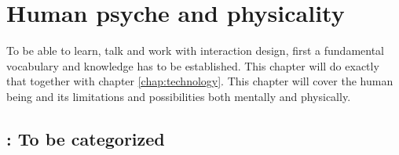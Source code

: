 \chapter{Human psyche and physicality} \label{chap:human_psyche_and_physicality}
To be able to learn, talk and work with interaction design, first a fundamental vocabulary and knowledge has to be established. This chapter will do exactly that together with chapter \ref{chap:technology}. This chapter will cover the human being and its limitations and possibilities both mentally and physically.

\vfill \minitoc \newpage





\section{\todo : To be categorized}


